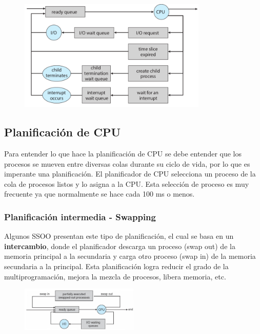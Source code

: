 \documentclass{templateNote}
\begin{document}
\begin{figure}[H]
    \centering
    \includegraphics[width=0.8\textwidth]{img/diagr.png}
\end{figure}

\newpage
\subsection*{Planificación de CPU}
Para entender lo que hace la planificación de CPU se debe entender que los procesos se mueven entre diversas colas durante su ciclo de vida, por lo que es imperante una planificación.
El planificador de CPU selecciona un proceso de la cola de procesos listos y lo asigna a la CPU. Esta selección de proceso es muy frecuente ya que normalmente se hace cada 100 ms o menos.

\subsubsection*{Planificación intermedia - Swapping}
Algunos SSOO presentan este tipo de planificación, el cual se basa en un \textbf{intercambio}, donde el planificador descarga un proceso (swap out) de la memoria principal a la secundaria y carga otro proceso (swap in) de la memoria secundaria a la principal.
Esta planificación logra reducir el grado de la multiprogramación, mejora la mezcla de procesos, libera memoria, etc.

\begin{figure}[H]
    \centering
    \includegraphics[width=0.5\textwidth]{img/swapping.png}
\end{figure}
\end{document}
